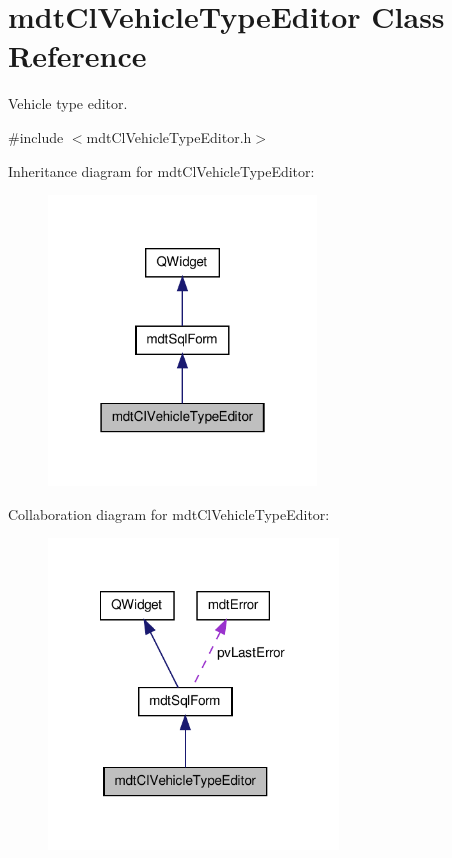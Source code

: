 \hypertarget{classmdt_cl_vehicle_type_editor}{\section{mdt\-Cl\-Vehicle\-Type\-Editor Class Reference}
\label{classmdt_cl_vehicle_type_editor}
}


Vehicle type editor.  




{\ttfamily \#include $<$mdt\-Cl\-Vehicle\-Type\-Editor.\-h$>$}



Inheritance diagram for mdt\-Cl\-Vehicle\-Type\-Editor\-:\nopagebreak
\begin{figure}[H]
\begin{center}
\leavevmode
\includegraphics[width=202pt]{classmdt_cl_vehicle_type_editor__inherit__graph}
\end{center}
\end{figure}


Collaboration diagram for mdt\-Cl\-Vehicle\-Type\-Editor\-:\nopagebreak
\begin{figure}[H]
\begin{center}
\leavevmode
\includegraphics[width=218pt]{classmdt_cl_vehicle_type_editor__coll__graph}
\end{center}
\end{figure}
